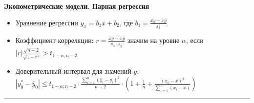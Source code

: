 \documentclass[a4paper,12pt]{extarticle}
\begin{document}
{
\bfseries   Эконометрические модели. Парная регрессия
\par\vspace{1mm}
}

{\small
\begin{itemize}
\item Уравнение регрессии \(y_x = b_1x+b_2\), где \(b_1 = \frac{\overline{xy}-\overline{x}\overline{y}}{s^2_x} \)
\item Коэффициент корреляции: $r = \frac{\overline{xy}-\overline{x}\overline{y}}{s_x\cdot s_y}$ значим на уровне $\alpha$, если 
$|r|\frac{\sqrt{n-2}}{\sqrt{1-r^2}}>t_{1-\alpha,n-2}$
\item Доверительный интервал для значений \(y\):\quad
\(|y^*_0-\hat{y}_0| \leqslant t_{1-\alpha; n-2} \cdot \frac{\sum\limits_{i=1}^n (\hat{y}_i-y_i)^2}{n-2} \cdot\left(
          1 + \frac{1}{n} 
            + \frac{(x_0-\bar{x})^2}{\sum\limits_{i=1}^n (x_i-\bar{x})}
        \right)
\)
\end{itemize}
}
\medskip
\hrule
\medskip 
\end{document}
